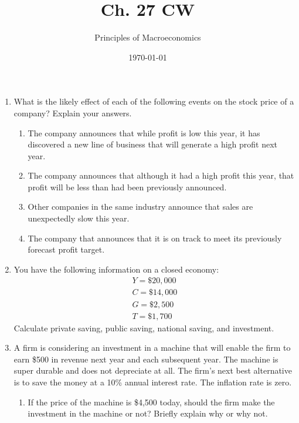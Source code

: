 \documentclass{article}
\title{Ch. 27 CW}
\author{Principles of Macroeconomics}
\date{\today}
\begin{document}
\maketitle

\begin{enumerate}

\item What is the likely effect of each of the following events on the stock price of a company? Explain your answers.

	\begin{enumerate}
	
	\item The company announces that while profit is low this year, it has discovered a new line of business that will generate a high profit next year.
	
	\item The company announces that although it had a high profit this year, that profit will be less than had been previously announced.
	
	\item Other companies in the same industry announce that sales are unexpectedly slow this year.
	
	\item The company that announces that it is on track to meet its previously forecast profit target.
	
	\end{enumerate}

\item You have the following information on a closed economy:
	\begin{gather*}
	Y = \$20,000 \\
	C = \$14,000 \\
	G = \$2,500 \\
	T = \$1,700
	\end{gather*}
	Calculate private saving, public saving, national saving, and investment.
	
\item A firm is considering an investment in a machine that will enable the firm to earn \$500 in revenue next year and each subsequent year. The machine is super durable and does not depreciate at all. The firm's next best alternative is to save the money at a 10\% annual interest rate. The inflation rate is zero.

	\begin{enumerate}
	
	\item If the price of the machine is \$4,500 today, should the firm make the investment in the machine or not? Briefly explain why or why not.
	

\end{enumerate}
\end{enumerate}
\end{document}
